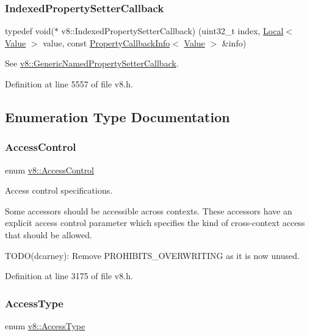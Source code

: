 \subsubsection{\texorpdfstring{Indexed\+Property\+Setter\+Callback}{IndexedPropertySetterCallback}}
{\footnotesize\ttfamily typedef void($\ast$ v8\+::\+Indexed\+Property\+Setter\+Callback) (uint32\+\_\+t index, \mbox{\hyperlink{classv8_1_1Local}{Local}}$<$ \mbox{\hyperlink{classv8_1_1Value}{Value}} $>$ value, const \mbox{\hyperlink{classv8_1_1PropertyCallbackInfo}{Property\+Callback\+Info}}$<$ \mbox{\hyperlink{classv8_1_1Value}{Value}} $>$ \&info)}

See {\ttfamily \mbox{\hyperlink{namespacev8_af74716c6e95a269c6cd4314662fd0a7e}{v8\+::\+Generic\+Named\+Property\+Setter\+Callback}}}. 

Definition at line 5557 of file v8.\+h.



\subsection{Enumeration Type Documentation}
\mbox{\label{namespacev8_a31d8355cb043d7d2dda3f4a52760b64e}} 
\subsubsection{\texorpdfstring{Access\+Control}{AccessControl}}
{\footnotesize\ttfamily enum \mbox{\hyperlink{namespacev8_a31d8355cb043d7d2dda3f4a52760b64e}{v8\+::\+Access\+Control}}}

Access control specifications.

Some accessors should be accessible across contexts. These accessors have an explicit access control parameter which specifies the kind of cross-\/context access that should be allowed.

T\+O\+D\+O(dcarney)\+: Remove P\+R\+O\+H\+I\+B\+I\+T\+S\+\_\+\+O\+V\+E\+R\+W\+R\+I\+T\+I\+NG as it is now unused. 

Definition at line 3175 of file v8.\+h.

\mbox{\label{namespacev8_add8bef6469c5b94706584124e610046c}} 
\subsubsection{\texorpdfstring{Access\+Type}{AccessType}}
{\footnotesize\ttfamily enum \mbox{\hyperlink{namespacev8_add8bef6469c5b94706584124e610046c}{v8\+::\+Access\+Type}}}

